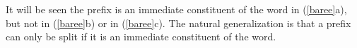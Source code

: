 \documentclass[output=paper,
modfonts
]{LSP/langsci}
\newcommand{\rfa}[2]{(\ref{#1}{#2})}
\def\urf#1{$^{\textrm{\scriptsize{#1}}}$}
\begin{document}
%
%
%
%
%
%
It will be seen the prefix is an immediate constituent of the word in \rfa{baree}{a}, but not
in \rfa{baree}{b} or in \rfa{baree}{c}.  The natural generalization is that a prefix can only
be split if it is an immediate constituent of the word.
\end{document}
